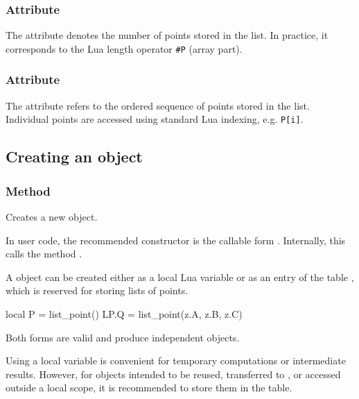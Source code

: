\subsubsection{Attribute }
\label{ssub:attr_list_point_n}

The attribute  denotes the number of points stored in the list.
In practice, it corresponds to the Lua length operator \texttt{\#P} (array part).

\subsubsection{Attribute }
\label{ssub:attr_list_point_items}

The attribute  refers to the ordered sequence of points stored in the list.
Individual points are accessed using standard Lua indexing, e.g. \texttt{P[i]}.


\subsection{Creating an object}
\label{subsec:list_point_create}

\subsubsection{Method }
\label{ssub:meth_list_point_new}

Creates a new  object.

In user code, the recommended constructor is the callable form .
Internally, this calls the method .

\medskip

A  object can be created either as a local Lua variable
or as an entry of the table , which is reserved for storing
lists of points.

\begin{tkzexample}
local P = list_point()
LP.Q = list_point(z.A, z.B, z.C)
\end{tkzexample}

Both forms are valid and produce independent  objects.

\medskip

Using a local variable is convenient for temporary computations or intermediate results.
However, for objects intended to be reused, transferred to ,
or accessed outside a local scope, it is recommended to store them in the
 table.

